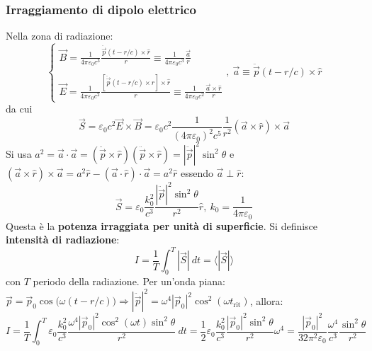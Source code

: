 \documentclass[10pt, a4paper]{scrartcl}
\numberwithin{equation}{subsection}
\theoremstyle{style1}
\begin{document}
\subsubsection{Irraggiamento di dipolo elettrico}\label{ide}

Nella zona di radiazione:
\[
\begin{cases}
	\displaystyle \vec{B} = \frac{1}{4\pi \varepsilon _0 c^3}\frac{\ddot{\vec{p}}(t - r /c)\times \hat{r}}{r}\equiv \frac{1}{4\pi \varepsilon _0 c^3}\frac{\vec{a}}{r}\\
	\\
	\displaystyle \vec{E}= \frac{1}{4\pi \varepsilon _0 c^2} \frac{\left[ \ddot{\vec{p}}(t- r / c) \times \hat{r} \right] \times \hat{r}}{r}\equiv \frac{1}{4\pi \varepsilon _0 c^2} \frac{\vec{a}\times \hat{r}}{r}
\end{cases}, \ \vec{a}\equiv \ddot{\vec{p}}(t - r /c) \times \hat{r}
\] 
da cui
\begin{equation*}
	\vec{S}=\varepsilon _0 c^2 \vec{E}\times \vec{B}=\varepsilon _0 c^2 \frac{1}{(4 \pi \varepsilon _0)^2 c^5} \frac{1}{r^2} (\vec{a}\times \hat{r}) \times \vec{a}
\end{equation*}
Si usa $a^2 = \vec{a}\cdot \vec{a}=(\ddot{\vec{p}}\times \hat{r}) (\ddot{\vec{p}}\times \hat{r}) = |\ddot{\vec{p}}|^2 \sin^2 \theta $ e $(\vec{a}\times \hat{r})\times \vec{a}= a^2 \hat{r}- (\vec{a}\cdot \hat{r}) \cdot \vec{a}= a^2 \hat{r}$ essendo $\vec{a}\perp \hat{r}$:
\begin{equation}
	\vec{S}= \varepsilon _0 \frac{k_0^2}{c^3} \frac{|\ddot{\vec{p}}|^2 \sin^2 \theta }{r^2} \hat{r}, \ k_0 = \frac{1}{4\pi \varepsilon _0}
\end{equation}
Questa \`e la \textbf{potenza irraggiata per unit\`a di superficie}. Si definisce \textbf{intensit\`a di radiazione}:
\begin{equation}
	I = \frac{1}{T} \int_{0} ^T |\vec{S}| \ dt = \langle |\vec{S}| \rangle
\end{equation}
con $T$ periodo della radiazione. Per un'onda piana: $\vec{p}=\vec{p}_0 \cos\big(\omega(t - r /c)\big) \Rightarrow |\ddot{\vec{p}}|^2 = \omega^4 \left\lvert \vec{p}_0 \right\rvert ^2 \cos^2 (\omega t_\text{rit})$, allora:
\begin{equation*}
	I = \frac{1}{T}\int_{0} ^T \varepsilon _0 \frac{k_0^2}{c^3} \frac{\omega^4 \left\lvert \vec{p}_0 \right\rvert ^2 \cos^2 (\omega t) \sin^2 \theta }{r^2} \ dt = \frac{1}{2}\varepsilon _0 \frac{k_0^2}{c^3}\frac{\left\lvert \vec{p}_0 \right\rvert ^2 \sin ^2 \theta }{ r^2}\omega^4  = \frac{\left\lvert \vec{p}_0 \right\rvert ^2}{32 \pi^2 \varepsilon _0} \frac{\omega^4}{c^3}\frac{\sin^2 \theta }{r^2}
\end{equation*}
\end{document}
